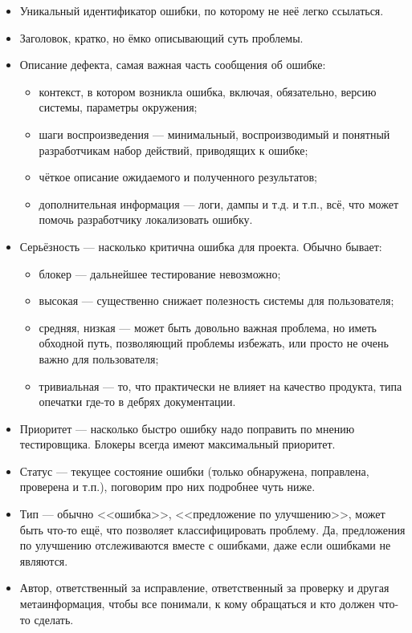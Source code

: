 \documentclass{../../text-style}
\begin{document}
\begin{itemize}
    \item Уникальный идентификатор ошибки, по которому не неё легко ссылаться.
    \item Заголовок, кратко, но ёмко описывающий суть проблемы.
    \item Описание дефекта, самая важная часть сообщения об ошибке:
    \begin{itemize}
        \item контекст, в котором возникла ошибка, включая, обязательно, версию системы, параметры окружения;
        \item шаги воспроизведения --- минимальный, воспроизводимый и понятный разработчикам набор действий, приводящих к ошибке;
        \item чёткое описание ожидаемого и полученного результатов;
        \item дополнительная информация --- логи, дампы и т.д. и т.п., всё, что может помочь разработчику локализовать ошибку.
    \end{itemize}
    \item Серьёзность --- насколько критична ошибка для проекта. Обычно бывает:
    \begin{itemize}
        \item блокер --- дальнейшее тестирование невозможно;
        \item высокая --- существенно снижает полезность системы для пользователя;
        \item средняя, низкая --- может быть довольно важная проблема, но иметь обходной путь, позволяющий проблемы избежать, или просто не очень важно для пользователя;
        \item тривиальная --- то, что практически не влияет на качество продукта, типа опечатки где-то в дебрях документации.
    \end{itemize}
    \item Приоритет --- насколько быстро ошибку надо поправить по мнению тестировщика. Блокеры всегда имеют максимальный приоритет.
    \item Статус --- текущее состояние ошибки (только обнаружена, поправлена, проверена и т.п.), поговорим про них подробнее чуть ниже.
    \item Тип --- обычно <<ошибка>>, <<предложение по улучшению>>, может быть что-то ещё, что позволяет классифицировать проблему. Да, предложения по улучшению отслеживаются вместе с ошибками, даже если ошибками не являются.
    \item Автор, ответственный за исправление, ответственный за проверку и другая метаинформация, чтобы все понимали, к кому обращаться и кто должен что-то сделать.
\end{itemize}
\end{document}
